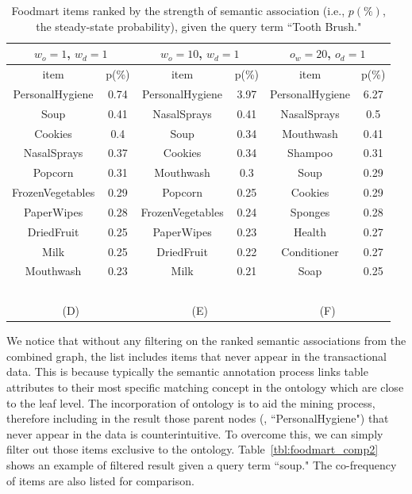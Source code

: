 \begin{table}[tbh]
\begin{center}
\begin{tabular}{ c c | c c | c c }
\hline
\multicolumn{2}{c|}{$w_o=1$, $w_d=1$}&\multicolumn{2}{c|}{$w_o=10$, $w_d=1$}&\multicolumn{2}{c}{$o_w=20$, $o_d=1$}\\
\hline
item	&	p(\%)	&	item	&	p(\%)	&	item	&	p(\%)	\\
				\hline							
PersonalHygiene	&	0.74	&	PersonalHygiene	&	3.97	&	PersonalHygiene	&	6.27	\\
Soup	&	0.41	&	NasalSprays	&	0.41	&	NasalSprays	&	0.5	\\
Cookies	&	0.4	&	Soup	&	0.34	&	Mouthwash	&	0.41	\\
NasalSprays	&	0.37	&	Cookies	&	0.34	&	Shampoo	&	0.31	\\
Popcorn	&	0.31	&	Mouthwash	&	0.3	&	Soup	&	0.29	\\
FrozenVegetables	&	0.29	&	Popcorn	&	0.25	&	Cookies	&	0.29	\\
PaperWipes	&	0.28	&	FrozenVegetables	&	0.24	&	Sponges	&	0.28	\\
DriedFruit	&	0.25	&	PaperWipes	&	0.23	&	Health	&	0.27	\\
Milk	&	0.25	&	DriedFruit	&	0.22	&	Conditioner	&	0.27	\\
Mouthwash	&	0.23	&	Milk	&	0.21	&	Soap	&	0.25	\\
\hline
\multicolumn{4}{c}{~}\\
\multicolumn{2}{c}{(D)}  &  \multicolumn{2}{c}{(E)}  & \multicolumn{2}{c}{(F)}\\
\end{tabular}
\end{center}
\caption[Top results on the Foodmart dataset.]{\label{tbl:foodmart_comp} Foodmart items ranked by the strength of semantic association  (i.e., $p(\%)$, the steady-state probability), given the query term ``Tooth Brush."}
\end{table}

We notice that without any filtering on the ranked semantic associations from the combined graph, the list includes items that never appear in the transactional data. This is because typically the semantic annotation process links table attributes to their most specific matching concept in the ontology which are close to the leaf level. The incorporation of ontology is to aid the mining process, therefore including in the result those parent nodes (\eg, ``PersonalHygiene") that never appear in the data is counterintuitive. To overcome this, we can simply filter out those items exclusive to the ontology. Table~\ref{tbl:foodmart_comp2} shows an example of filtered result given a query term ``soup." The co-frequency of items are also listed for comparison.


